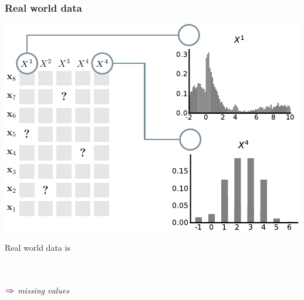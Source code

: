 \documentclass[xcolor={usenames,dvipsnames,svgnames}, compress, aspectratio=169, 11pt]{beamer}
\newcommand{\comment}[3][\small]{\begin{minipage}{1\linewidth}
          \raggedleft
          {
            $\color{violet}\boldsymbol\Rightarrow$
            #1
            {\emph{#2}}
          }
      \end{minipage}#3\\
}
\begin{document}
\begin{frame}[t, htt=bgrey2]
  \frametitle{Real world data}

  \large
  \begin{minipage}[t]{0.6\linewidth}
    \includegraphics[width=.99\linewidth]{figures/abda-miss-hist-type}
  \end{minipage}\hfill\begin{minipage}[t]{0.3\linewidth}
    \vspace{-150pt}
    { Real world data is}\\[5pt]
    \\
    \\
    \comment[\normalsize]{missing values}{}\\
  \end{minipage}  
\end{frame}
\end{document}
